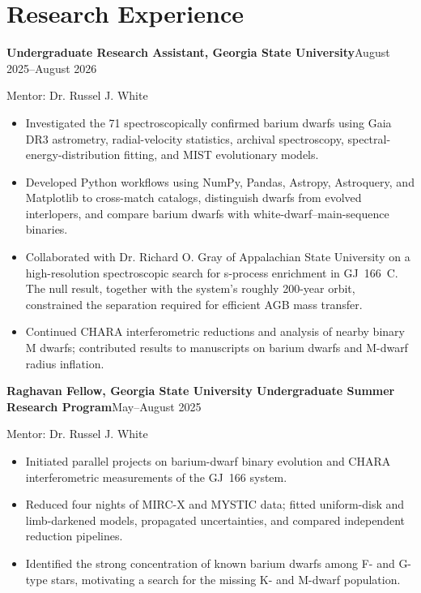 \documentclass[10pt,a4paper]{article}
\newcommand{\entry}[2]{%
  \par\vspace{2pt}%
  \noindent\textbf{#1}\hfill#2\par
}
\newcommand{\cvline}[1]{\noindent#1\par}
\newenvironment{items}
  {\begin{itemize}[leftmargin=1.2em,itemsep=0.6pt,topsep=1.5pt,parsep=0pt,
                   label=\textbullet]}
  {\end{itemize}}
\begin{document}
\section{Research Experience}

\entry{Undergraduate Research Assistant, Georgia State University}{August 2025--August 2026}
\cvline{Mentor: Dr. Russel J. White}
\begin{items}
  \item Investigated the 71 spectroscopically confirmed barium dwarfs using Gaia DR3
        astrometry, radial-velocity statistics, archival spectroscopy,
        spectral-energy-distribution fitting, and MIST evolutionary models.
  \item Developed Python workflows using NumPy, Pandas, Astropy, Astroquery, and
        Matplotlib to cross-match catalogs, distinguish dwarfs from evolved interlopers,
        and compare barium dwarfs with white-dwarf--main-sequence binaries.
  \item Collaborated with Dr. Richard O. Gray of Appalachian State University on a
        high-resolution spectroscopic search for s-process enrichment in GJ~166~C. The
        null result, together with the system's roughly 200-year orbit, constrained the
        separation required for efficient AGB mass transfer.
  \item Continued CHARA interferometric reductions and analysis of nearby binary M dwarfs;
        contributed results to manuscripts on barium dwarfs and M-dwarf radius inflation.
\end{items}

\entry{Raghavan Fellow, Georgia State University Undergraduate Summer Research Program}{May--August 2025}
\cvline{Mentor: Dr. Russel J. White}
\begin{items}
  \item Initiated parallel projects on barium-dwarf binary evolution and CHARA
        interferometric measurements of the GJ~166 system.
  \item Reduced four nights of MIRC-X and MYSTIC data; fitted uniform-disk and
        limb-darkened models, propagated uncertainties, and compared independent
        reduction pipelines.
  \item Identified the strong concentration of known barium dwarfs among F- and G-type
        stars, motivating a search for the missing K- and M-dwarf population.
\end{items}
\end{document}

